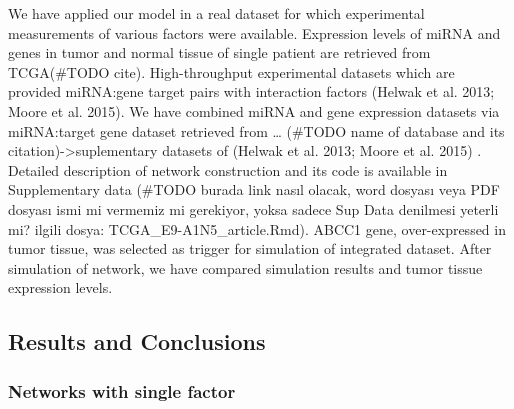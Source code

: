 \documentclass[]{article}
\begin{document}
We have applied our model in a real dataset for which experimental
measurements of various factors were available. Expression levels of
miRNA and genes in tumor and normal tissue of single patient are
retrieved from TCGA(\#TODO cite). High-throughput experimental datasets
which are provided miRNA:gene target pairs with interaction factors
(Helwak et al. 2013; Moore et al. 2015). We have combined miRNA and gene
expression datasets via miRNA:target gene dataset retrieved from
\ldots{} (\#TODO name of database and its
citation)-\textgreater{}suplementary datasets of (Helwak et al. 2013;
Moore et al. 2015) . Detailed description of network construction and
its code is available in Supplementary data (\#TODO burada link nasıl
olacak, word dosyası veya PDF dosyası ismi mi vermemiz mi gerekiyor,
yoksa sadece Sup Data denilmesi yeterli mi? ilgili dosya:
TCGA\_E9-A1N5\_article.Rmd). ABCC1 gene, over-expressed in tumor tissue,
was selected as trigger for simulation of integrated dataset. After
simulation of network, we have compared simulation results and tumor
tissue expression levels.

\hypertarget{results-and-conclusions}{%
\subsection{Results and Conclusions}\label{results-and-conclusions}}

\hypertarget{networks-with-single-factor}{%
\subsubsection{Networks with single
factor}\label{networks-with-single-factor}}
\end{document}
